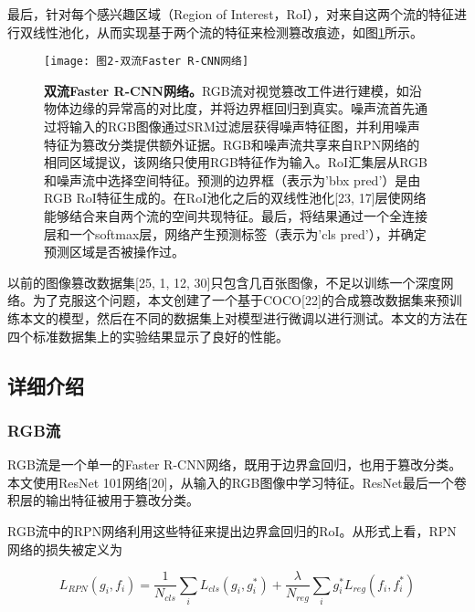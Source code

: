 \documentclass[a4paper]{article}
\begin{document}
最后，针对每个感兴趣区域（Region of Interest，RoI），对来自这两个流的特征进行双线性池化，从而实现基于两个流的特征来检测篡改痕迹，如图\ref{fig:双流Faster R-CNN网络}所示。

\begin{figure}[H]
\centering
\texttt{[image: 图2-双流Faster R-CNN网络]}
\caption{\label{fig:双流Faster R-CNN网络}\textbf{双流Faster R-CNN网络。}RGB流对视觉篡改工件进行建模，如沿物体边缘的异常高的对比度，并将边界框回归到真实。噪声流首先通过将输入的RGB图像通过SRM过滤层获得噪声特征图，并利用噪声特征为篡改分类提供额外证据。RGB和噪声流共享来自RPN网络的相同区域提议，该网络只使用RGB特征作为输入。RoI汇集层从RGB和噪声流中选择空间特征。预测的边界框（表示为'bbx pred'）是由RGB RoI特征生成的。在RoI池化之后的双线性池化[23, 17]层使网络能够结合来自两个流的空间共现特征。最后，将结果通过一个全连接层和一个softmax层，网络产生预测标签（表示为'cls pred'），并确定预测区域是否被操作过。}
\end{figure}

以前的图像篡改数据集[25, 1, 12, 30]只包含几百张图像，不足以训练一个深度网络。为了克服这个问题，本文创建了一个基于COCO[22]的合成篡改数据集来预训练本文的模型，然后在不同的数据集上对模型进行微调以进行测试。本文的方法在四个标准数据集上的实验结果显示了良好的性能。


\subsection{详细介绍}
\subsubsection{RGB流}
RGB流是一个单一的Faster R-CNN网络，既用于边界盒回归，也用于篡改分类。本文使用ResNet 101网络[20]，从输入的RGB图像中学习特征。ResNet最后一个卷积层的输出特征被用于篡改分类。

RGB流中的RPN网络利用这些特征来提出边界盒回归的RoI。从形式上看，RPN网络的损失被定义为

\begin{equation}
L_{RPN}(g_{i}, f_{i}) = \frac{1}{N_{cls}} \sum_{i} {L_{cls}(g_{i}, g_{i}^{*})} + 
\frac{\lambda}{N_{reg}} \sum_{i} {g_{i}^{*} L_{reg}(f_{i}, f_{i}^{*})}
\end{equation}
\end{document}
